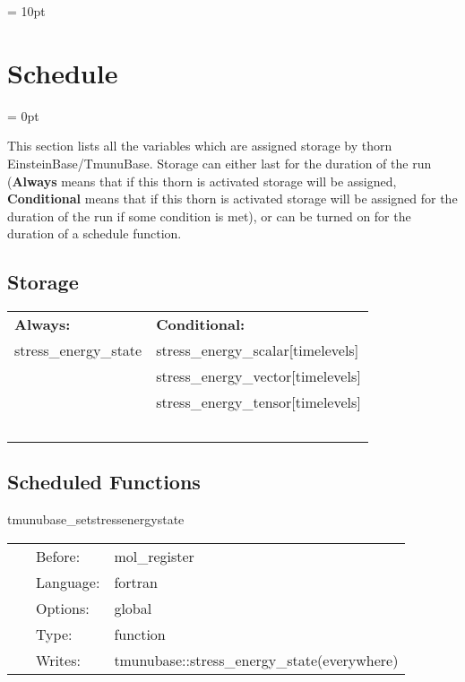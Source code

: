 \documentclass{article}
\begin{document}
\vspace{5mm}\parskip = 10pt 

\section{Schedule} 


\parskip = 0pt


\noindent This section lists all the variables which are assigned storage by thorn EinsteinBase/TmunuBase.  Storage can either last for the duration of the run ({\bf Always} means that if this thorn is activated storage will be assigned, {\bf Conditional} means that if this thorn is activated storage will be assigned for the duration of the run if some condition is met), or can be turned on for the duration of a schedule function.


\subsection*{Storage}

\hspace{5mm}

 \begin{tabular*}{160mm}{ll} 

{\bf Always:}& {\bf Conditional:} \\ 
 stress\_energy\_state &  stress\_energy\_scalar[timelevels]\\ 
~ &  stress\_energy\_vector[timelevels]\\ 
~ &  stress\_energy\_tensor[timelevels]\\ 
~ & ~\\ 
\end{tabular*} 


\subsection*{Scheduled Functions}
\vspace{5mm}


\hspace{5mm} tmunubase\_setstressenergystate 

\hspace{5mm}{\it set the stress\_energy\_state variable } 


\hspace{5mm}

 \begin{tabular*}{160mm}{cll} 
~ & Before:  & mol\_register \\ 
~ & Language:  & fortran \\ 
~ & Options:  & global \\ 
~ & Type:  & function \\ 
~ & Writes:  & tmunubase::stress\_energy\_state(everywhere) \\ 
\end{tabular*} 
\end{document}
